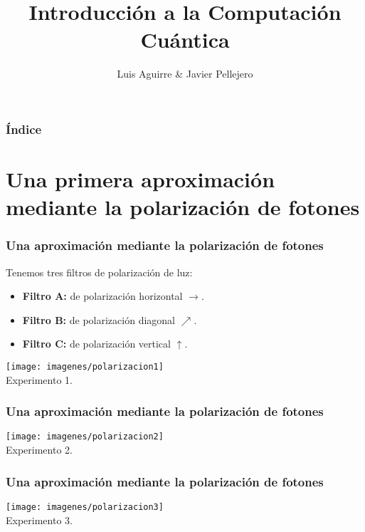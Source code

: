 \documentclass{beamer}
\title[Computación Cuántica]{Introducción a la Computación Cuántica}
\author{Luis Aguirre \& Javier Pellejero}
\institute[UCM]{Universidad Complutense de Madrid\\ Facultad de Informática}
\begin{document}
\begin{frame}
	\titlepage
\end{frame}

\begin{frame}
\frametitle{Índice}
	\tableofcontents
\end{frame}

\section{Una primera aproximación mediante la polarización de fotones}

\begin{frame}
	\frametitle{Una aproximación mediante la polarización de fotones}
	Tenemos tres filtros de polarización de luz:
	\begin{itemize}
		\item \textbf{Filtro A:} de polarización horizontal $\rightarrow$.
		\item \textbf{Filtro B:} de polarización diagonal $\nearrow$.
		\item \textbf{Filtro C:} de polarización vertical $\uparrow$.
	\end{itemize}
	\begin{center}
	\texttt{[image: imagenes/polarizacion1]}\\
	Experimento 1.
	\end{center}
\end{frame}

\begin{frame}
	\frametitle{Una aproximación mediante la polarización de fotones}
	\begin{center}
	\texttt{[image: imagenes/polarizacion2]}\\
	Experimento 2.
	\end{center}		
\end{frame}

\begin{frame}
	\frametitle{Una aproximación mediante la polarización de fotones}
	\begin{center}
	\texttt{[image: imagenes/polarizacion3]}\\
	Experimento 3.
	\end{center}
\end{frame}
\end{document}
